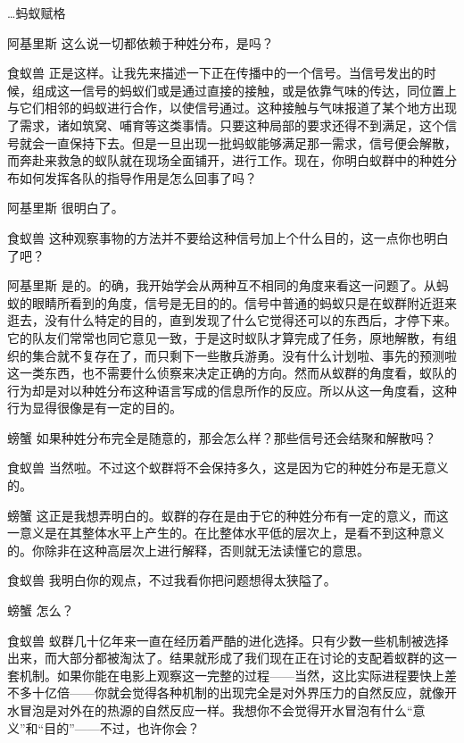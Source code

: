 \begin{dialog}{…蚂蚁赋格}
\begin{dialogue}
\item[阿基里斯]这么说一切都依赖于种姓分布，是吗？

\item[食蚁兽]正是这样。让我先来描述一下正在传播中的一个信号。当信号发出的时候，组成这一信号的蚂蚁们或是通过直接的接触，或是依靠气味的传达，同位置上与它们相邻的蚂蚁进行合作，以使信号通过。这种接触与气味报道了某个地方出现了需求，诸如筑窝、哺育等这类事情。只要这种局部的要求还得不到满足，这个信号就会一直保持下去。但是一旦出现一批蚂蚁能够满足那一需求，信号便会解散，而奔赴来救急的蚁队就在现场全面铺开，进行工作。现在，你明白蚁群中的种姓分布如何发挥各队的指导作用是怎么回事了吗？

\item[阿基里斯]很明白了。

\item[食蚁兽]这种观察事物的方法并不要给这种信号加上个什么目的，这一点你也明白了吧？

\item[阿基里斯]是的。的确，我开始学会从两种互不相同的角度来看这一问题了。从蚂蚁的眼睛所看到的角度，信号是无目的的。信号中普通的蚂蚁只是在蚁群附近逛来逛去，没有什么特定的目的，直到发现了什么它觉得还可以的东西后，才停下来。它的队友们常常也同它意见一致，于是这时蚁队才算完成了任务，原地解散，有组织的集合就不复存在了，而只剩下一些散兵游勇。没有什么计划啦、事先的预测啦这一类东西，也不需要什么侦察来决定正确的方向。然而从蚁群的角度看，蚁队的行为却是对以种姓分布这种语言写成的信息所作的反应。所以从这一角度看，这种行为显得很像是有一定的目的。

\item[螃蟹]如果种姓分布完全是随意的，那会怎么样？那些信号还会结聚和解散吗？

\item[食蚁兽]当然啦。不过这个蚁群将不会保持多久，这是因为它的种姓分布是无意义的。

\item[螃蟹]这正是我想弄明白的。蚁群的存在是由于它的种姓分布有一定的意义，而这一意义是在其整体水平上产生的。在比整体水平低的层次上，是看不到这种意义的。你除非在这种高层次上进行解释，否则就无法读懂它的意思。

\item[食蚁兽]我明白你的观点，不过我看你把问题想得太狭隘了。

\item[螃蟹]怎么？

\item[食蚁兽]蚁群几十亿年来一直在经历着严酷的进化选择。只有少数一些机制被选择出来，而大部分都被淘汰了。结果就形成了我们现在正在讨论的支配着蚁群的这一套机制。如果你能在电影上观察这一完整的过程——当然，这比实际进程要快上差不多十亿倍——你就会觉得各种机制的出现完全是对外界压力的自然反应，就像开水冒泡是对外在的热源的自然反应一样。我想你不会觉得开水冒泡有什么“意义”和“目的”——不过，也许你会？


\end{dialogue}
\end{dialog}
